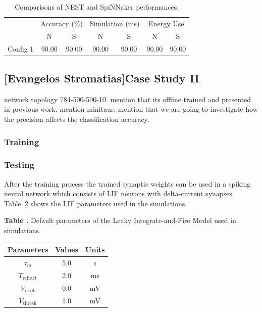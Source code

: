 \begin{table}[h]
\caption{Comparisons of NEST and SpiNNaker performances.}
\begin{center}
\begin{tabular} {c|c|c|c|c|c|c}
	 &\multicolumn{2}{c|}{Accuracy (\%)}  &\multicolumn{2}{c|}{Simulation (ms)}
	 &\multicolumn{2}{c}{Energy Use}   \\
	 \cline{2-7}
	& N & S & N & S & N & S\\
    \hline
    Config 1 & 90.00 & 90.00 & 90.00 & 90.00 & 90.00 & 90.00 \\

\end{tabular}
\label{tbl:compare}
\end{center}
\end{table}


\subsection{[Evangelos Stromatias]Case Study II}
network topology 784-500-500-10. mention that its offline trained and presented in previous work. mention minitaur. mention that we are going to investigate how the precision affects the classification accuracy.

\subsubsection{Training}
\citet{10.3389/fnins.2013.00178}
\subsubsection{Testing}
After the training process the trained synaptic weights can be used in a spiking neural network which consists of LIF neurons with delta-current synapses. Table~\ref{Tab:NeuralParams} shows the LIF parameters used in the simulations.

\begin{table}[htb!]
\textbf{\label{Tab:NeuralParams} Table .}{ Default parameters of the Leaky Integrate-and-Fire Model used in simulations.}

\processtable{}
{\begin{tabular}{c|c|c} %
Parameters & Values & Units \\
\hline
$\tau_{m}$ 		 & 5.0 & s  \\
$T_{\mathrm{refract}}$ & 2.0 & ms \\
$V_{\mathrm{reset}}$ 		 & 0.0 & mV \\
$V_{\mathrm{thresh}}$ 		 & 1.0 & mV \\
\end{tabular}}{}
\end{table}


